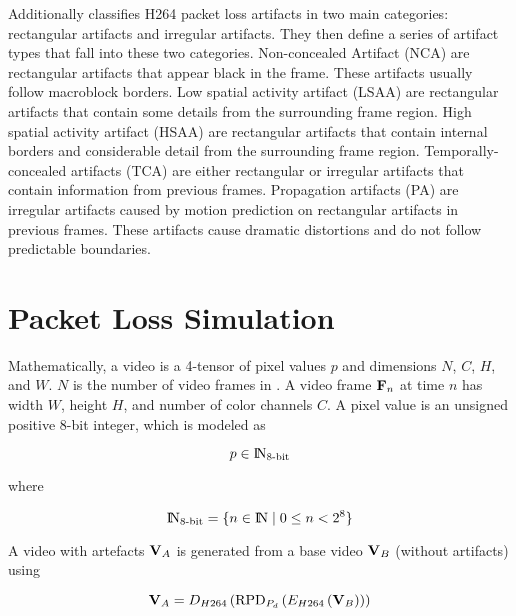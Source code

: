 Additionally \cite{Glavota2016} classifies H264 packet loss artifacts in two main categories: rectangular artifacts and irregular artifacts. They then define a series of artifact types that fall into these two categories. Non-concealed Artifact (NCA) are rectangular artifacts that appear black in the frame. These artifacts usually follow macroblock borders. Low spatial activity artifact (LSAA) are rectangular artifacts that contain some details from the surrounding frame region. High spatial activity artifact (HSAA) are rectangular artifacts that contain internal borders and considerable detail from the surrounding frame region. Temporally-concealed artifacts (TCA) are either rectangular or irregular artifacts that contain information from previous frames. Propagation artifacts (PA) are irregular artifacts caused by motion prediction on rectangular artifacts in previous frames. These artifacts cause dramatic distortions and do not follow predictable boundaries.

\section{Packet Loss Simulation}
\label{sec:simulation}

\def\N8{\setN_\text{8-bit}}

Mathematically, a video  is a 4-tensor of pixel values $p$ and dimensions $N$, $C$, $H$, and $W$. $N$ is the number of video frames in . A video frame $\mathbf{F}_n$ at time $n$ has width $W$, height $H$, and number of color channels $C$. A pixel value is an unsigned positive 8-bit integer, which is modeled as

\begin{equation}
  \label{eq:PV}
  p \in \N8
\end{equation}

where

\begin{equation}
  \label{eq:N8}
  \N8 = \{ n \in \setN \mid 0 \le n < 2^8  \}
\end{equation}

\def\VA{\mat{V}_A}
\def\VB{\mat{V}_B}

A video with artefacts $\VA$ is generated from a base video $\VB$ (without artifacts) using

\def\DEC{D_{H264}}
\def\RPD{\text{RPD}_{P_d}}
\def\ENC{E_{H264}}
\begin{equation}
  \label{eq:V_A}
  \VA = \DEC\left(\RPD\left(\ENC\left(\VB\right)\right)\right)
\end{equation}

